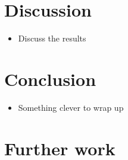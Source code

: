 \documentclass[main.tex]{subfiles}
\begin{document}
\section{Discussion}


\begin{itemize}
    \item Discuss the results
\end{itemize}








\section{Conclusion}

\begin{itemize}
    \item Something clever to wrap up
\end{itemize}



\section{Further work}
\end{document}
